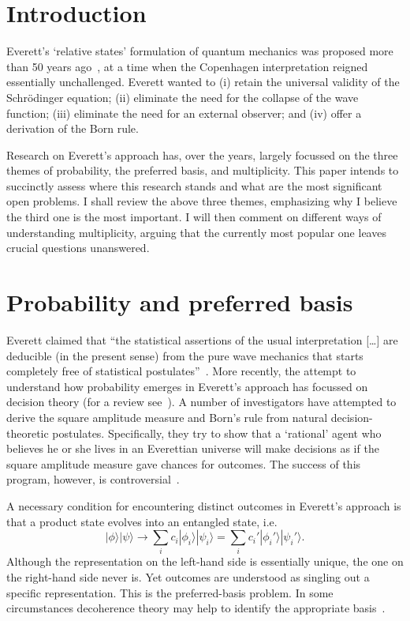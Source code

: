 \documentclass[12pt]{article}
\begin{document}
\section{Introduction}
\label{sec1}
%
Everett's `relative states' formulation of quantum
mechanics was proposed more than 50 years
ago~\cite{everett1,everett2}, at a time when the
Copenhagen interpretation reigned essentially
unchallenged.  Everett wanted to (i) retain
the universal validity of the Schr\"{o}dinger
equation; (ii) eliminate the need for the
collapse of the wave function; (iii) eliminate
the need for an external observer; and (iv)
offer a derivation of the Born rule.

Research on Everett's approach has, over the
years, largely focussed on the three themes of
probability, the preferred basis, and multiplicity.
This paper intends to succinctly assess where this
research stands and what are the most significant
open problems.  I shall review the above three themes,
emphasizing why I believe the third one is the most
important.  I will then comment on different ways of
understanding multiplicity, arguing that the
currently most popular one leaves crucial questions
unanswered.
%
\section{Probability and preferred basis}
\label{sec2}
%
Everett claimed that ``the statistical assertions
of the usual interpretation \mbox{[\ldots]} are deducible
(in the present sense) from the pure wave mechanics
that starts completely free of statistical
postulates''~\cite{everett2}.  More recently,
the attempt to understand how probability
emerges in Everett's approach has focussed on
decision theory (for a review see~\cite{greaves}).
A number of investigators have attempted to derive
the square amplitude measure and Born's rule
from natural decision-theoretic postulates.
Specifically, they try to show that
a `rational' agent who believes he
or she lives in an Everettian universe will make
decisions as if the square amplitude measure
gave chances for outcomes.  The success of this
program, however, is controversial~\cite{kent}.

A necessary condition for encountering distinct
outcomes in Everett's approach is that a product
state evolves into an entangled state, i.e.
%
\begin{equation}
|\phi\rangle |\psi\rangle \rightarrow
\sum_i c_i |\phi_i\rangle |\psi_i\rangle
= \sum_i c_i' |\phi_i' \rangle |\psi_i' \rangle .
\label{split}
\end{equation}
%
Although the representation on the left-hand side
is essentially unique, the one on the right-hand side
never is.  Yet outcomes are understood as singling
out a specific representation.  This is the
preferred-basis problem.  In some circumstances
decoherence theory may help to identify the
appropriate basis~\cite{schlosshauer}.
\end{document}
